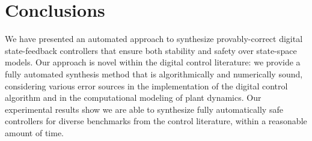 \section{Conclusions}
\label{sec:conclusions}

We have presented an automated approach to synthesize provably-correct digital state-feedback controllers that ensure both stability and safety over state-space models.   
%
Our approach is novel within the digital control literature: 
we provide a fully automated synthesis method that is algorithmically and numerically sound,
considering various error sources in the implementation of the digital control algorithm and in the computational modeling of plant dynamics.
%
Our experimental results show we are able to synthesize fully automatically safe controllers for diverse benchmarks from the control literature, 
within a reasonable amount of time.  
%





